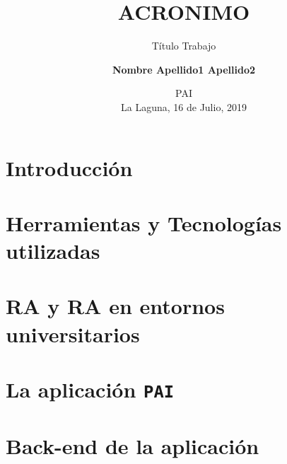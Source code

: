 \documentclass[blue,uncompressed]{beamer}
\title{\textbf{ACRONIMO}}
\subtitle{Título Trabajo}
\author[Nombre Apellido1 Apellido2]
{
	\textbf{Nombre Apellido1 Apellido2}
}
\institute[ULL]
\date[Programación de Aplicaciones Interactivas]{\textsc{PAI}     \\
                           La Laguna, 16 de Julio, 2019}
\newcommand{\ULLAR}{\texttt{PAI{}}}
\begin{document}
	\begin{frame}[plain]
	\titlepage
	\end{frame}

		\section{Introducción}
			
		\section{Herramientas y Tecnologías utilizadas}
			
		\section{RA y RA en entornos universitarios}
			
		\section{La aplicación \ULLAR}
			
		\section{Back-end de la aplicación}
			
		
\end{document}

